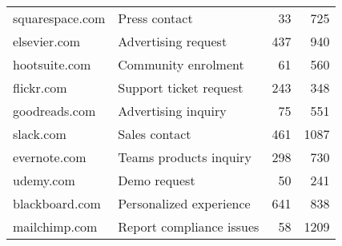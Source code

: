 \begin{table}
\begin{tabularx}{0.85\columnwidth}{llrr}
\footnotesize squarespace.com	& \footnotesize Press contact	& \footnotesize 33	& \footnotesize 725	\\
\footnotesize elsevier.com		& \footnotesize Advertising request	& \footnotesize 437	& \footnotesize 940	\\
\footnotesize hootsuite.com		& \footnotesize Community enrolment	& \footnotesize 61	& \footnotesize 560	\\
\footnotesize flickr.com		& \footnotesize Support ticket request	& \footnotesize 243	& \footnotesize 348	\\
\footnotesize goodreads.com		& \footnotesize Advertising inquiry	& \footnotesize 75	& \footnotesize 551	\\

\footnotesize slack.com			& \footnotesize Sales contact	& \footnotesize 461	& \footnotesize 1087	\\
\footnotesize evernote.com		& \footnotesize Teams products inquiry	& \footnotesize 298	& \footnotesize 730	\\
\footnotesize udemy.com			& \footnotesize Demo request	& \footnotesize 50	& \footnotesize 241	\\
\footnotesize blackboard.com	& \footnotesize Personalized experience	& \footnotesize 641	& \footnotesize 838	\\
\footnotesize mailchimp.com		& \footnotesize Report compliance issues	& \footnotesize 58	& \footnotesize 1209	\\  

\end{tabularx}
\end{table}
